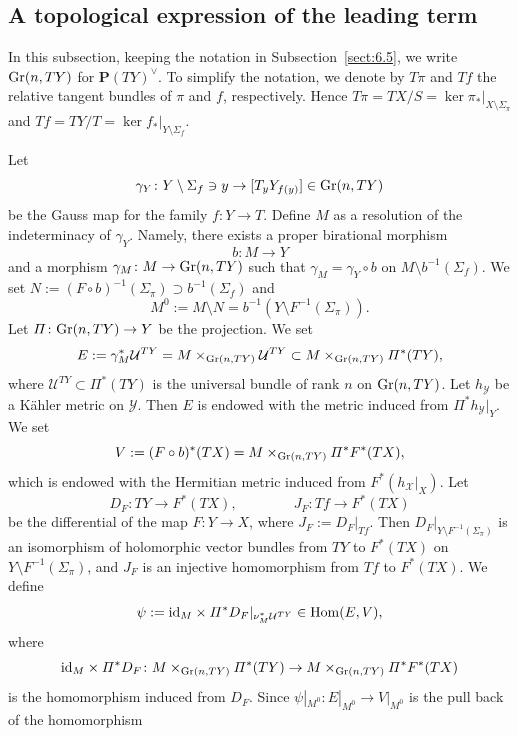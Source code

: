 \documentclass[amscd, leqno]{amsart}
\theoremstyle{plain}
\theoremstyle{definition}
\theoremstyle{remark}
\begin{document}
\subsection
{A topological expression of the leading term}
\label{sect:7.1}
\par
In this subsection, keeping the notation in Subsection~\ref{sect:6.5}, we write ${\rm Gr}(n, TY)$ for ${\mathbf P}(TY)^{\lor}$.
To simplify the notation, we denote by $T\pi$ and $Tf$ the relative tangent bundles of $\pi$ and $f$, respectively. 
Hence $T\pi = TX/S = \ker \pi_{*} |_{X\setminus\Sigma_{\pi}}$ and $Tf = TY/T = \ker f_{*} |_{Y\setminus\Sigma_{f}}$. 
\par
Let
$$
\gamma_{Y} \colon Y\setminus\Sigma_{f} \ni y \to [T_{y}Y_{f(y)}] \in {\rm Gr}(n, TY) 
$$ 
be the Gauss map for the family $f \colon Y \to T$. Define $M$ as a resolution of the indeterminacy of $\gamma_{Y}$. 
Namely, there exists a proper birational morphism
$$
b \colon M \to Y
$$ 
and a morphism $\gamma_{M} \colon M \to {\rm Gr}(n, TY)$ such that 
$\gamma_{M} = \gamma_{Y} \circ b$ on $M \setminus b^{-1}(\Sigma_{f})$.
We set $N := (F\circ b)^{-1}(\Sigma_{\pi}) \supset b^{-1}(\Sigma_{f})$ and 
$$
M^{0} := M \setminus N = b^{-1}(Y\setminus F^{-1}(\Sigma_{\pi})).
$$
Let $\varPi \colon {\rm Gr}(n, TY) \to Y$ be the projection. We set 
$$
E := \gamma_{M}^{*}{\mathcal U}^{TY} = M \times_{{\rm Gr}(n, TY)} {\mathcal U}^{TY} \subset M \times_{{\rm Gr}(n, TY)} \varPi^{*}(TY), 
$$
where ${\mathcal U}^{TY} \subset \varPi^{*}(TY)$ is the universal bundle of rank $n$ on ${\rm Gr}(n, TY)$. 
Let $h_{\mathcal Y}$ be a K\"ahler metric on ${\mathcal Y}$. 
Then $E$ is endowed with the metric induced from $\varPi^{*}h_{\mathcal Y}|_{Y}$. We set
$$
V := (F\circ b)^{*}(TX) = M \times_{{\rm Gr}(n, TY)} \varPi^{*}F^{*}(TX),
$$
which is endowed with the Hermitian metric induced from $F^{*}(h_{\mathcal X}|_{X})$. Let
$$
D_{F} \colon TY \to F^{*}(TX),
\qquad\qquad
J_{F} \colon Tf \to F^{*}(TX)
$$
be the differential of the map $F \colon Y \to X$, where $J_{F} := D_{F}|_{Tf}$. 
Then $D_{F}|_{Y\setminus F^{-1}(\Sigma_{\pi})}$  is an isomorphism of holomorphic vector bundles from $TY$ to $F^{*}(TX)$ 
on $Y\setminus F^{-1}(\Sigma_{\pi})$, and $J_{F}$ is an injective homomorphism from $Tf$ to $F^{*}(TX)$.
We define 
$$
\psi := {\rm id}_{M} \times \varPi^{*}D_{F} |_{\nu_{M}^{*}{\mathcal U}^{TY}} \in {\rm Hom}(E, V),
$$
where
$$
{\rm id}_{M} \times \varPi^{*}D_{F} \colon M \times_{{\rm Gr}(n, TY)} \varPi^{*}(TY) \to M \times_{{\rm Gr}(n, TY)} \varPi^{*}F^{*}(TX)
$$ 
is the homomorphism induced from $D_{F}$. Since $\psi |_{M^{0}} \colon E |_{M^{0}} \to V |_{M^{0}}$ is the pull back of the homomorphism 
\end{document}
